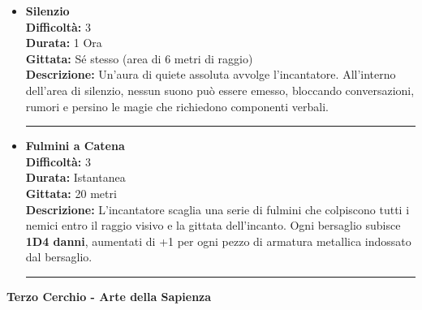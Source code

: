 \documentclass[./magie.tex]{subfiles}
\begin{document}
\begin{itemize}
\item \textbf{Silenzio} \\
\textbf{Difficoltà:} 3 \\
\textbf{Durata:} 1 Ora \\
\textbf{Gittata:} Sé stesso (area di 6 metri di raggio) \\
\textbf{Descrizione:} Un'aura di quiete assoluta avvolge l'incantatore. All'interno dell'area di silenzio, nessun suono può essere emesso, bloccando conversazioni, rumori e persino le magie che richiedono componenti verbali.

\vspace{0.2cm}
\noindent
\begin{center}
\rule{\textwidth}{0.4pt} 
\end{center}
\vspace{0.2cm}

\item \textbf{Fulmini a Catena} \\
\textbf{Difficoltà:} 3 \\
\textbf{Durata:} Istantanea \\
\textbf{Gittata:} 20 metri \\
\textbf{Descrizione:} L'incantatore scaglia una serie di fulmini che colpiscono tutti i nemici entro il raggio visivo e la gittata dell'incanto. Ogni bersaglio subisce \textbf{1D4 danni}, aumentati di +1 per ogni pezzo di armatura metallica indossato dal bersaglio.

\vspace{0.2cm}
\noindent
\begin{center}
\rule{\textwidth}{0.4pt} 
\end{center}
\vspace{0.2cm}

\end{itemize}

\clearpage
\vspace{0.2cm}
{\zarafirtitlefont\Large\bfseries Terzo Cerchio - Arte della Sapienza}
\end{document}
